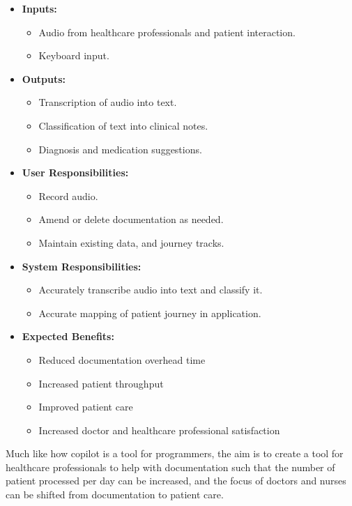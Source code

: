\documentclass[12pt]{article}
\begin{document}
\begin{itemize}
  \item \textbf{Inputs:}
  \begin{itemize}
    \item Audio from healthcare professionals and patient interaction.
    \item Keyboard input.
  \end{itemize}
  \item \textbf{Outputs:}
  \begin{itemize}
    \item Transcription of audio into text.
    \item Classification of text into clinical notes.
    \item Diagnosis and medication suggestions.
  \end{itemize}
  \item \textbf{User Responsibilities:}
  \begin{itemize}
    \item Record audio.
    \item Amend or delete documentation as needed.
    \item Maintain existing data, and journey tracks.
  \end{itemize}
  \item \textbf{System Responsibilities:}
  \begin{itemize}
    \item Accurately transcribe audio into text and classify it.
    \item Accurate mapping of patient journey in application.
  \end{itemize}

\item{\textbf{Expected Benefits:}}

\begin{itemize}
  \item Reduced documentation overhead time
  \item Increased patient throughput
  \item Improved patient care
  \item Increased doctor and healthcare professional satisfaction
\end{itemize}
\end{itemize}
Much like how copilot is a tool for programmers, the aim is to create a tool for healthcare professionals to help with documentation such that the number of patient processed per day can be increased, and the focus of doctors and nurses can be shifted from documentation to patient care.
\end{document}
